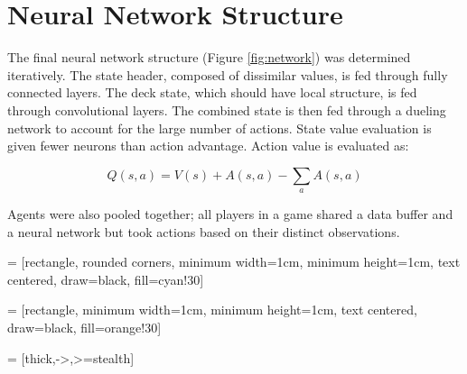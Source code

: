 \documentclass[10pt]{article} %
\begin{document}
\newpage

\section{Neural Network Structure}

The final neural network structure (Figure \ref{fig:network}) was determined iteratively. The state header, composed of dissimilar values, is fed through fully connected layers. The deck state, which should have local structure, is fed through convolutional layers. The combined state is then fed through a dueling network to account for the large number of actions. State value evaluation is given fewer neurons than action advantage. Action value is evaluated as:

\begin{equation}
Q(s,a) = V(s) + A(s,a) - \sum_a A(s,a)
\end{equation}

Agents were also pooled together; all players in a game shared a data buffer and a neural network but took actions based on their distinct observations.

 = [rectangle, rounded corners, 
minimum width=1cm, 
minimum height=1cm,
text centered, 
draw=black, 
fill=cyan!30]

 = [rectangle, 
minimum width=1cm, 
minimum height=1cm, 
text centered,  
draw=black, 
fill=orange!30]

 = [thick,->,>=stealth]
\end{document}
